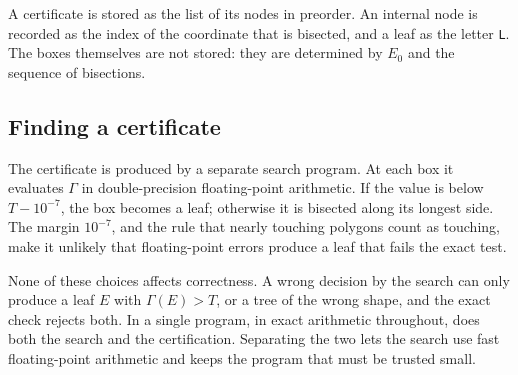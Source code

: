 A certificate is stored as the list of its nodes in preorder. An internal node is recorded as the index of the coordinate that is bisected, and a leaf as the letter \texttt{L}. The boxes themselves are not stored: they are determined by $E_0$ and the sequence of bisections.

\subsection{Finding a certificate}\label{sec:search}

The certificate is produced by a separate search program. At each box it evaluates $\Gamma$ in double-precision floating-point arithmetic. If the value is below $T-10^{-7}$, the box becomes a leaf; otherwise it is bisected along its longest side. The margin $10^{-7}$, and the rule that nearly touching polygons count as touching, make it unlikely that floating-point errors produce a leaf that fails the exact test.

None of these choices affects correctness. A wrong decision by the search can only produce a leaf $E$ with $\Gamma(E)>T$, or a tree of the wrong shape, and the exact check rejects both. In \cite{kallusromik2018} a single program, in exact arithmetic throughout, does both the search and the certification. Separating the two lets the search use fast floating-point arithmetic and keeps the program that must be trusted small.
